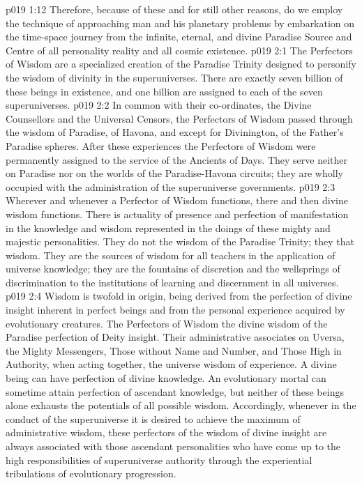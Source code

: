 \vs p019 1:12 \pc Therefore, because of these and for still other reasons, do we employ the technique of approaching man and his planetary problems by embarkation on the time\hyp{}space journey from the infinite, eternal, and divine Paradise Source and Centre of all personality reality and all cosmic existence.
\vs p019 2:1 The Perfectors of Wisdom are a specialized creation of the Paradise Trinity designed to personify the wisdom of divinity in the superuniverses. There are exactly seven billion of these beings in existence, and one billion are assigned to each of the seven superuniverses.
\vs p019 2:2 In common with their co\hyp{}ordinates, the Divine Counsellors and the Universal Censors, the Perfectors of Wisdom passed through the wisdom of Paradise, of Havona, and except for Divinington, of the Father’s Paradise spheres. After these experiences the Perfectors of Wisdom were permanently assigned to the service of the Ancients of Days. They serve neither on Paradise nor on the worlds of the Paradise\hyp{}Havona circuits; they are wholly occupied with the administration of the superuniverse governments.
\vs p019 2:3 \pc Wherever and whenever a Perfector of Wisdom functions, there and then divine wisdom functions. There is actuality of presence and perfection of manifestation in the knowledge and wisdom represented in the doings of these mighty and majestic personalities. They do not  the wisdom of the Paradise Trinity; they  that wisdom. They are the sources of wisdom for all teachers in the application of universe knowledge; they are the fountains of discretion and the wellsprings of discrimination to the institutions of learning and discernment in all universes.
\vs p019 2:4 Wisdom is twofold in origin, being derived from the perfection of divine insight inherent in perfect beings and from the personal experience acquired by evolutionary creatures. The Perfectors of Wisdom  the divine wisdom of the Paradise perfection of Deity insight. Their administrative associates on Uversa, the Mighty Messengers, Those without Name and Number, and Those High in Authority, when acting together,  the universe wisdom of experience. A divine being can have perfection of divine knowledge. An evolutionary mortal can sometime attain perfection of ascendant knowledge, but neither of these beings alone exhausts the potentials of all possible wisdom. Accordingly, whenever in the conduct of the superuniverse it is desired to achieve the maximum of administrative wisdom, these perfectors of the wisdom of divine insight are always associated with those ascendant personalities who have come up to the high responsibilities of superuniverse authority through the experiential tribulations of evolutionary progression.

